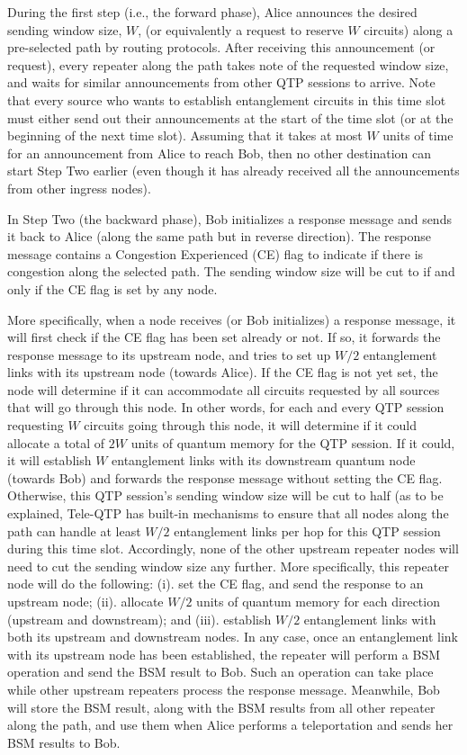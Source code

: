 \documentclass[10pt]{article}
\begin{document}
During the first step (i.e., the forward phase), Alice announces the desired sending window size, $W$, (or equivalently a request to reserve $W$ circuits) along a pre-selected path by routing protocols. After receiving this announcement (or request), every repeater along the path takes note of the requested window size, and waits for similar announcements from other QTP sessions to arrive.
Note that every source who wants to establish entanglement circuits in this time slot must either send out their announcements at the start of the time slot (or at the beginning of the
next time slot). Assuming that it takes at most $W$ units of time for an announcement from Alice to reach Bob, then no other destination can start Step Two earlier (even though it has already received all the announcements from other ingress nodes).

In Step Two (the backward phase), Bob initializes a response message and sends it back to Alice (along the same path but in reverse direction). The response message contains a Congestion Experienced (CE) flag to indicate if there is congestion along the selected path. The sending window size will be cut to if and only if the CE flag is set by any node.

More specifically, when a node receives (or Bob initializes) a response message, it will first check if the CE flag has been set already or not. If so, it forwards the response message to its upstream node, and tries to set up $W/2$ entanglement links with its upstream node (towards Alice). If the CE flag is not yet set, the node will determine if it can accommodate all circuits requested by all sources that will go through this node. In other words, for each and every QTP session requesting $W$ circuits going through this node, it will determine if it could allocate a total of $2W$ units of quantum memory for the QTP session. If it could, it will establish $W$ entanglement links with its downstream quantum node (towards Bob) and forwards the response message without setting the CE flag. Otherwise, this QTP session’s sending window size will be cut to half (as to be explained, Tele-QTP has built-in mechanisms to ensure that all nodes along the path can handle at least $W/2$ entanglement links per hop for this QTP session during this time slot. Accordingly, none of the other upstream repeater nodes will need to cut the sending window size any further. More specifically, this repeater node will do the following: (i). set the CE flag, and send the response to an upstream node; (ii). allocate $W/2$ units of quantum memory for each direction (upstream and downstream); and (iii). establish $W/2$ entanglement links with both its upstream and downstream nodes. In any case, once an entanglement link with its upstream node has been established, the repeater will perform a BSM operation and send the BSM result to Bob. Such an operation can take place while other upstream repeaters process the response message. Meanwhile, Bob will store the BSM result, along with the BSM results from all other repeater along the path, and use them when Alice performs a teleportation and sends her BSM results to Bob.


\end{document}
